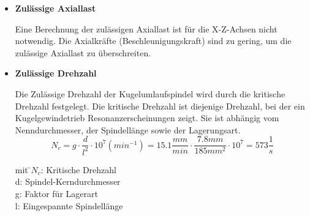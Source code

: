 \documentclass{scrartcl}
\begin{document}
\begin{itemize}

\item \textbf{Zulässige Axiallast}
 
Eine Berechnung der zulässigen Axiallast ist für die X-Z-Achsen nicht notwendig. Die Axialkräfte (Beschleunigungskraft) sind zu gering, um die zulässige Axiallast zu überschreiten. 




	 		





\item \textbf{Zulässige Drehzahl}

Die Zulässige Drehzahl der Kugelumlaufspindel wird durch die kritische Drehzahl festgelegt. Die kritische Drehzahl ist diejenige Drehzahl, bei der ein Kugelgewindetrieb Resonanzerscheinungen zeigt. Sie ist abhängig vom Nenndurchmesser, der Spindellänge sowie der Lagerungsart.\\

\[N_c=g\cdot\dfrac{d}{l^2}\cdot 10^7 (min^{-1}) = 15.1\dfrac{mm}{min} \cdot \dfrac{7.8mm}{185mm^2}\cdot 10^7 = 573 \dfrac{1}{s}\]


\begin{tabbing}
mit \=$N_c$: Kritische Drehzahl\\
		\>d: Spindel-Kerndurchmesser\\
		\>g: Faktor für Lagerart\\
		\>l: Eingespannte Spindellänge\\
		
\end{tabbing}


\end{itemize}
\end{document}
